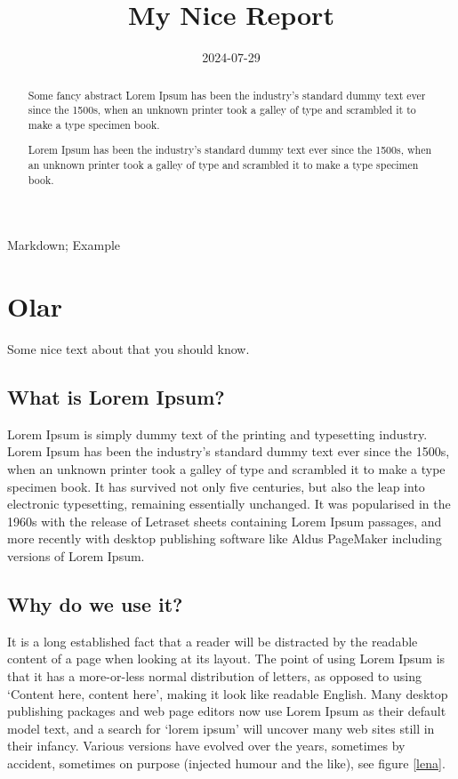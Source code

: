 \documentclass[conference,8pt,portuguese,]{IEEEtran}
\title{My Nice Report}
\author{
            \IEEEauthorblockN{Example Author}
        \IEEEauthorblockA{%
            Universidade de Brasília \\
            Brasília, Brazil \\
            user@mail.com}
         \and
            \IEEEauthorblockN{Another Author}
        \IEEEauthorblockA{%
            Universidade Católica de Brasília \\
            Brasília, Brazil \\
            user2@mail.com}
        }
\date{2024-07-29}
\begin{document}
\maketitle
\begin{abstract}
Some fancy abstract Lorem Ipsum has been the industry's standard dummy
text ever since the 1500s, when an unknown printer took a galley of type
and scrambled it to make a type specimen book.

Lorem Ipsum has been the industry's standard dummy text ever since the
1500s, when an unknown printer took a galley of type and scrambled it to
make a type specimen book.
\end{abstract}

\begin{IEEEkeywords}
    Markdown;
    Example\end{IEEEkeywords}

\hypertarget{olar}{%
\section{Olar}\label{olar}}

Some nice text about \autocite{msp430} that you should know.

\hypertarget{what-is-lorem-ipsum}{%
\subsection{What is Lorem Ipsum?}\label{what-is-lorem-ipsum}}

Lorem Ipsum is simply dummy text of the printing and typesetting
industry. Lorem Ipsum has been the industry's standard dummy text ever
since the 1500s, when an unknown printer took a galley of type and
scrambled it to make a type specimen book. It has survived not only five
centuries, but also the leap into electronic typesetting, remaining
essentially unchanged. It was popularised in the 1960s with the release
of Letraset sheets containing Lorem Ipsum passages, and more recently
with desktop publishing software like Aldus PageMaker including versions
of Lorem Ipsum.

\hypertarget{why-do-we-use-it}{%
\subsection{Why do we use it?}\label{why-do-we-use-it}}

It is a long established fact that a reader will be distracted by the
readable content of a page when looking at its layout. The point of
using Lorem Ipsum is that it has a more-or-less normal distribution of
letters, as opposed to using `Content here, content here', making it
look like readable English. Many desktop publishing packages and web
page editors now use Lorem Ipsum as their default model text, and a
search for `lorem ipsum' will uncover many web sites still in their
infancy. Various versions have evolved over the years, sometimes by
accident, sometimes on purpose (injected humour and the like), see
figure \ref{lena}.
\end{document}
